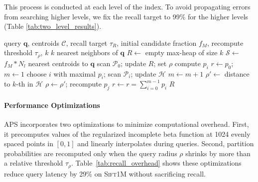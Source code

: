 This process is conducted at each level of the index. To avoid propagating errors from searching higher levels, we fix the recall target to 99\% for the higher levels (Table \ref{tab:two_level_results}).

\begin{algorithm}[h]
\small
\caption{Adaptive Partition Scanning (APS)}
\label{alg:aps}
\begin{algorithmic}[1]
\Require query $\mathbf q$, centroids $\mathcal C$, recall target $\tau_R$,
        initial candidate fraction $f_M$, recompute threshold $\tau_\rho$, $k$
\Ensure  $k$ nearest neighbors of $\mathbf q$
\State $R \leftarrow$ empty max-heap of size $k$
\State $\mathcal S \leftarrow$ $f_M *  N_l$ nearest centroids to $\mathbf q$
\State scan $\mathcal P_0$; update $R$; set $\rho$
    \State compute $p_i$
\EndFor
\State $r \leftarrow p_0$; $m \leftarrow 1$
    \State choose $i$ with maximal $p_i$; scan $\mathcal P_i$; update $\mathcal H$
    \State $m \leftarrow m + 1$
    \State $\rho' \leftarrow$ distance to $k$-th in $\mathcal H$
        \State $\rho \leftarrow \rho'$; recompute $p_j$
    \EndIf
    \State $r \leftarrow r=\sum^{m-1}_{i=0}p_i$
\EndWhile
\State \Return $R$
\end{algorithmic}
\end{algorithm}

\paragraph{Performance Optimizations}
APS incorporates two optimizations to minimize computational overhead. First, it precomputes values of the regularized incomplete beta function at 1024 evenly spaced points in $[0,1]$ and linearly interpolates during queries. Second, partition probabilities are recomputed only when the query radius $\rho$ shrinks by more than a relative threshold $\tau_{\rho}$. Table~\ref{tab:recall_overhead} shows these optimizations reduce query latency by 29\% on \textsc{Sift1M} without sacrificing recall.

